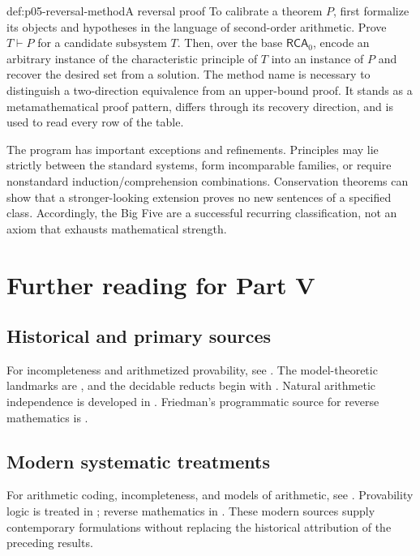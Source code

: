 \begin{hbmethod}{def:p05-reversal-method}{A reversal proof}
To calibrate a theorem \(P\), first formalize its objects and hypotheses in the
language of second-order arithmetic. Prove \(T\vdash P\) for a candidate
subsystem \(T\). Then, over the base \(\mathsf{RCA}_0\), encode an arbitrary
instance of the characteristic principle of \(T\) into an instance of \(P\)
and recover the desired set from a solution. The method name is necessary to
distinguish a two-direction equivalence from an upper-bound proof. It stands as
a metamathematical proof pattern, differs through its recovery direction, and
is used to read every row of the table.
\end{hbmethod}

The program has important exceptions and refinements. Principles may lie
strictly between the standard systems, form incomparable families, or require
nonstandard induction/comprehension combinations. Conservation theorems can
show that a stronger-looking extension proves no new sentences of a specified
class. Accordingly, the Big Five are a successful recurring classification,
not an axiom that exhausts mathematical strength.

\section{Further reading for Part V}
\label{sec:p05-further-reading}

\subsection*{Historical and primary sources}

For incompleteness and arithmetized provability, see
\cite{Godel1931,Rosser1936,Lob1955,Solovay1976,GuaspariSolovay1979}.
The model-theoretic landmarks are \cite{Skolem1934,Tennenbaum1959}, and the
decidable reducts begin with \cite{Presburger1929,Skolem1930Arithmetic,
FefermanVaught1959}.  Natural arithmetic independence is developed in
\cite{ParisHarrington1977,KanamoriMcAloon1987,Goodstein1944,KirbyParis1982}.
Friedman's programmatic source for reverse mathematics is
\cite{Friedman1975}.

\subsection*{Modern systematic treatments}

For arithmetic coding, incompleteness, and models of arithmetic, see
\cite{Shoenfield1967,BoolosBurgessJeffrey2007,Kaye1991}.  Provability logic is
treated in \cite{Boolos1993}; reverse mathematics in \cite{Simpson2009}.  These
modern sources supply contemporary formulations without replacing the
historical attribution of the preceding results.
